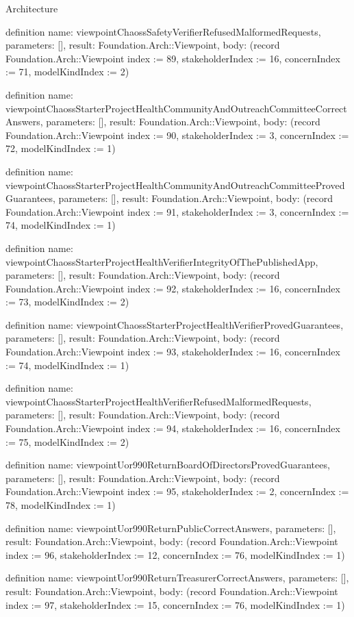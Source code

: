 \begin{lexlean}{Architecture}
\begin{semanticmodule}
definition{
  name: viewpointChaossSafetyVerifierRefusedMalformedRequests,
  parameters: [],
  result: Foundation.Arch::Viewpoint,
  body: (record Foundation.Arch::Viewpoint {index := 89, stakeholderIndex := 16, concernIndex := 71, modelKindIndex := 2})
}

definition{
  name: viewpointChaossStarterProjectHealthCommunityAndOutreachCommitteeCorrectAnswers,
  parameters: [],
  result: Foundation.Arch::Viewpoint,
  body: (record Foundation.Arch::Viewpoint {index := 90, stakeholderIndex := 3, concernIndex := 72, modelKindIndex := 1})
}

definition{
  name: viewpointChaossStarterProjectHealthCommunityAndOutreachCommitteeProvedGuarantees,
  parameters: [],
  result: Foundation.Arch::Viewpoint,
  body: (record Foundation.Arch::Viewpoint {index := 91, stakeholderIndex := 3, concernIndex := 74, modelKindIndex := 1})
}

definition{
  name: viewpointChaossStarterProjectHealthVerifierIntegrityOfThePublishedApp,
  parameters: [],
  result: Foundation.Arch::Viewpoint,
  body: (record Foundation.Arch::Viewpoint {index := 92, stakeholderIndex := 16, concernIndex := 73, modelKindIndex := 2})
}

definition{
  name: viewpointChaossStarterProjectHealthVerifierProvedGuarantees,
  parameters: [],
  result: Foundation.Arch::Viewpoint,
  body: (record Foundation.Arch::Viewpoint {index := 93, stakeholderIndex := 16, concernIndex := 74, modelKindIndex := 1})
}

definition{
  name: viewpointChaossStarterProjectHealthVerifierRefusedMalformedRequests,
  parameters: [],
  result: Foundation.Arch::Viewpoint,
  body: (record Foundation.Arch::Viewpoint {index := 94, stakeholderIndex := 16, concernIndex := 75, modelKindIndex := 2})
}

definition{
  name: viewpointUor990ReturnBoardOfDirectorsProvedGuarantees,
  parameters: [],
  result: Foundation.Arch::Viewpoint,
  body: (record Foundation.Arch::Viewpoint {index := 95, stakeholderIndex := 2, concernIndex := 78, modelKindIndex := 1})
}

definition{
  name: viewpointUor990ReturnPublicCorrectAnswers,
  parameters: [],
  result: Foundation.Arch::Viewpoint,
  body: (record Foundation.Arch::Viewpoint {index := 96, stakeholderIndex := 12, concernIndex := 76, modelKindIndex := 1})
}

definition{
  name: viewpointUor990ReturnTreasurerCorrectAnswers,
  parameters: [],
  result: Foundation.Arch::Viewpoint,
  body: (record Foundation.Arch::Viewpoint {index := 97, stakeholderIndex := 15, concernIndex := 76, modelKindIndex := 1})
}


\end{semanticmodule}
\end{lexlean}
